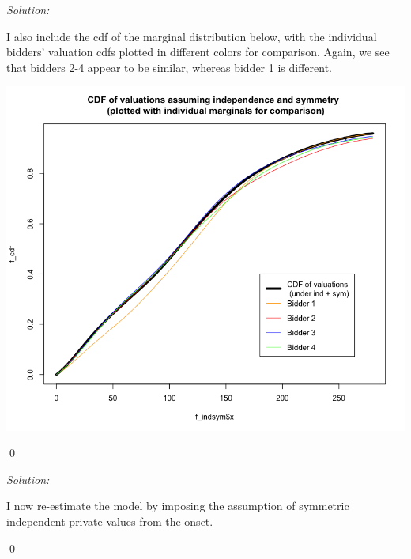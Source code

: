 \documentclass[12pt]{article}
\newenvironment{problem}[2][Problem]{\begin{trivlist}
\item[\hskip \labelsep {\bfseries #1}\hskip \labelsep {\bfseries #2.}]}{\end{trivlist}}
\newenvironment{sol}
    {\emph{Solution:}
    }
    {
    \qed
    }
\begin{document}
\begin{sol}
    I also include the cdf of the marginal distribution below, with the individual bidders' valuation cdfs plotted in different colors for comparison. Again, we see that bidders 2-4 appear to be similar, whereas bidder 1 is different.
    \begin{center}
        \includegraphics[scale=0.45]{CDF_val.png}
    \end{center}
\end{sol}
\begin{problem}{6}
\end{problem}
\begin{sol}
    I now re-estimate the model by imposing the assumption of symmetric independent private values from the onset. 
\end{sol}
\end{document}
